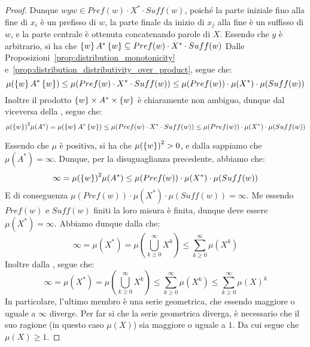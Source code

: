 \begin{proof}
  Dunque \(wyw \in Pref(w)\cdot X^* \cdot Suff(w)\), poiché la parte iniziale fino alla fine di \(x_i\) è un prefisso di \(w\), la parte finale da inizio di \(x_j\) alla fine è un suffisso di \(w\), e la parte centrale è ottenuta concatenando parole di \(X\).
  Essendo che \(y\) è arbitrario, si ha che \(\set{w}A^*\set{w} \subseteq Pref(w)\cdot X^* \cdot Suff(w)\)
  Dalle Proposizioni~\ref{prop:distribution_monotonicity} e~\ref{prop:distribution_distributivity_over_product}, segue che:
  \[\mu(\set{w}A^*\set{w}) \leq \mu(Pref(w)\cdot X^* \cdot Suff(w)) \leq \mu(Pref(w))\cdot \mu(X^*)\cdot \mu(Suff(w))\]
  Inoltre il prodotto \(\set{w}\times A^* \times \set{w}\) è chiaramente non ambiguo, dunque dal viceversa della , segue che:
  \[{\mu(\set{w})}^2\mu(A^*)=\mu(\set{w}A^*\set{w}) \leq \mu(Pref(w)\cdot X^* \cdot Suff(w)) \leq \mu(Pref(w))\cdot \mu(X^*)\cdot \mu(Suff(w))\]

  Essendo che \(\mu\) è positiva, si ha che \({\mu(\set{w})}^2 > 0\), e dalla  sappiamo che \(\mu(A^*) = \infty\).
  Dunque, per la disuguaglianza precedente, abbiamo che:
  \[\infty = {\mu(\set{w})}^2\mu(A^*) \leq \mu(Pref(w))\cdot \mu(X^*)\cdot \mu(Suff(w))\]
  E di conseguenza \(\mu(Pref(w))\cdot \mu(X^*)\cdot \mu(Suff(w)) = \infty\).
  Me essendo \(Pref(w)\) e \(Suff(w)\) finiti la loro misura è finita, dunque deve essere \(\mu(X^*) = \infty\).
  Abbiamo dunque dalla  che:
  \[\infty = \mu(X^*) = \mu(\bigcup_{k \geq 0}^{\infty} X^k) \leq \sum_{k \geq 0}^{\infty} \mu(X^k)\]
  Inoltre dalla , segue che:
  \[\infty = \mu(X^*) = \mu(\bigcup_{k \geq 0}^{\infty} X^k) \leq \sum_{k \geq 0}^{\infty} \mu(X^k)\leq \sum_{k \geq 0}^{\infty} {\mu(X)}^k\]
  In particolare, l'ultimo membro è una serie geometrica, che essendo maggiore o uguale a \(\infty\) diverge.
  Per far si che la serie geometrica diverga, è necessario che il suo ragione (in questo caso \(\mu(X)\)) sia maggiore o uguale a \(1\).
  Da cui segue che \(\mu(X) \geq 1\).
\end{proof}

